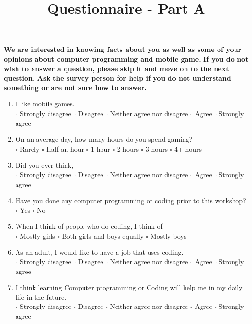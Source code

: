 \documentclass[12pt]{article}\pagestyle{myheadings}
\title{Questionnaire - Part A}
\theoremstyle{plain}
\begin{document}
\begin{mdframed}

\textbf{We are interested in knowing facts about you as well as some of your opinions about
computer programming and mobile game. If you do not wish to answer a question, please skip it and move on to the next question. Ask the survey person for help if you do not understand something or are not sure how
to answer.}

\end{mdframed}
\begin{mdframed}
\begin{enumerate}

\item I like mobile games. \\
$\square$ Strongly disagree $\square$ Disagree $\square$ Neither agree nor disagree $\square$ Agree $\square$ Strongly agree

\item On an average day, how many hours do you spend gaming? \\
$\square$ Rarely $\square$ Half an hour	$\square$ 1 hour $\square$ 2 hours $\square$ 3 hours $\square$	4+ hours

\item Did you ever think,  \\
$\square$ Strongly disagree $\square$ Disagree $\square$ Neither agree nor disagree $\square$ Agree $\square$ Strongly agree

\item Have you done any computer programming or coding prior to this workshop? \\
$\square$ Yes $\square$ No








\item When I think of people who do coding, I think of \\
$\square$ Mostly girls $\square$ Both girls and boys equally $\square$ Mostly boys


\item As an adult, I would like to have a job that uses coding. \\ 
$\square$ Strongly disagree $\square$ Disagree $\square$ Neither agree nor disagree $\square$ Agree $\square$ Strongly agree


\item I think learning Computer programming or Coding will help me in my daily life in the future.\\
$\square$ Strongly disagree $\square$ Disagree $\square$ Neither agree nor disagree $\square$ Agree $\square$ Strongly agree



\end{enumerate}

\end{mdframed}
\end{document}
